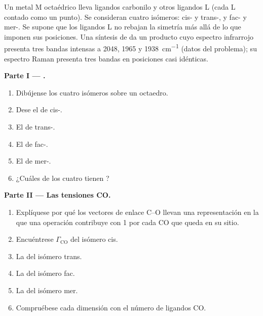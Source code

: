 \begin{problem}
\label{pb:b3:group-theory-applied:1}
Un metal M octaédrico lleva ligandos carbonilo y otros ligandos L (cada L
contado como un punto). Se consideran cuatro isómeros: cis- y
trans-, y fac- y mer-. Se supone que los ligandos L no
rebajan la simetría más allá de lo que imponen sus posiciones. Una síntesis de
 da un producto cuyo espectro infrarrojo presenta tres bandas
intensas a 2048, 1965 y \qty{1938}{cm^{-1}} (datos del problema); su espectro Raman
presenta tres bandas en posiciones casi idénticas.

\medskip\noindent\textbf{Parte I --- .}
\begin{enumerate}
  \item Dibújense los cuatro isómeros sobre un octaedro.
  \item Dese el  de cis-.
  \item El de trans-.
  \item El de fac-.
  \item El de mer-.
  \item ¿Cuáles de los cuatro tienen ?
\end{enumerate}

\medskip\noindent\textbf{Parte II --- Las tensiones CO.}
\begin{enumerate}[resume]
  \item Explíquese por qué los vectores de enlace C--O llevan una representación en la que una
        operación contribuye con 1 por cada CO que queda en su sitio.
  \item Encuéntrese $\Gamma_{\mathrm{CO}}$ del isómero cis.
  \item La del isómero trans.
  \item La del isómero fac.
  \item La del isómero mer.
  \item Compruébese cada dimensión con el número de ligandos CO.
\end{enumerate}


\end{problem}
